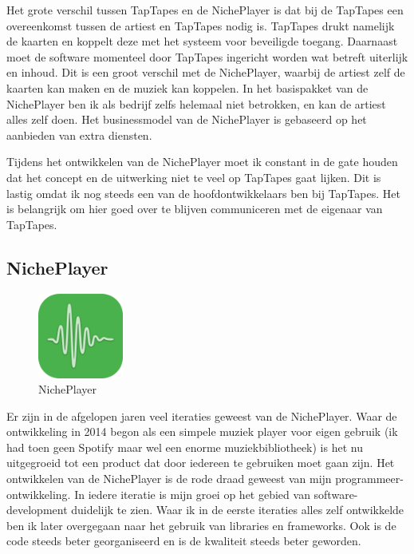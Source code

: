 Het grote verschil tussen TapTapes en de NichePlayer is dat bij de TapTapes een overeenkomst tussen de artiest en TapTapes nodig is. TapTapes drukt namelijk de kaarten  en koppelt deze met het systeem voor beveiligde toegang. Daarnaast moet de software momenteel door TapTapes ingericht worden wat betreft uiterlijk en inhoud. Dit is een groot verschil met de NichePlayer, waarbij de artiest zelf de kaarten kan maken en de muziek kan koppelen. In het basispakket van de NichePlayer ben ik als bedrijf zelfs helemaal niet betrokken, en kan de artiest alles zelf doen. Het businessmodel van de NichePlayer is gebaseerd op het aanbieden van extra diensten.

Tijdens het ontwikkelen van de NichePlayer moet ik constant in de gate houden dat het concept en de uitwerking niet te veel op TapTapes gaat lijken. Dit is lastig omdat ik nog steeds een van de hoofdontwikkelaars ben bij TapTapes. Het is belangrijk om hier goed over te blijven communiceren met de eigenaar van TapTapes.

\subsection{NichePlayer}
\begin{figure}
    \centering
    \includegraphics[width=0.25\textwidth]{assets/critical-review/NichePlayer.png}
    \caption{NichePlayer}
    \label{fig:critical-review:NichePlayer}
\end{figure}

Er zijn in de afgelopen jaren veel iteraties geweest van de NichePlayer. Waar de ontwikkeling in 2014 begon als een simpele muziek player voor eigen gebruik (ik had toen geen Spotify maar wel een enorme muziekbibliotheek) is het nu uitgegroeid tot een product dat door iedereen te gebruiken moet gaan zijn. Het ontwikkelen van de NichePlayer is de rode draad geweest van mijn programmeer-ontwikkeling. In iedere iteratie is mijn groei op het gebied van software-development duidelijk te zien. Waar ik in de eerste iteraties alles zelf ontwikkelde ben ik later overgegaan naar het gebruik van libraries en frameworks. Ook is de code steeds beter georganiseerd en is de kwaliteit steeds beter geworden.

